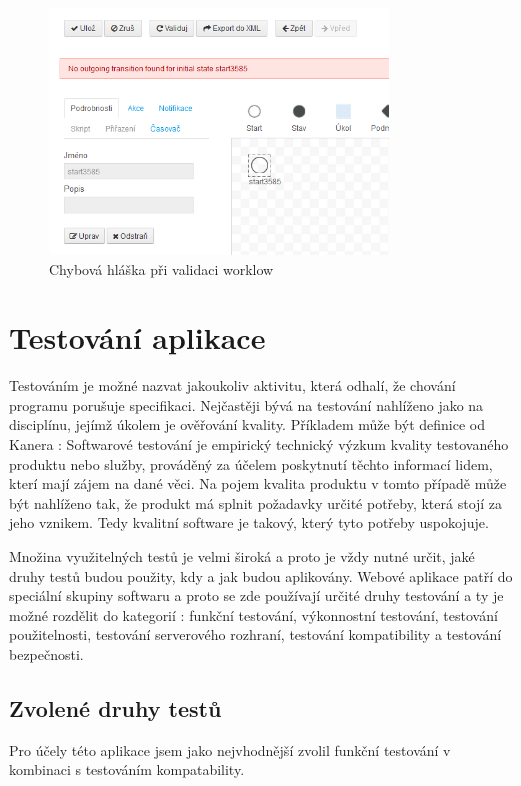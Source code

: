 \documentclass{fithesis}
\begin{document}
\begin{figure}[htp]
\centering
\includegraphics[width=340px]{images/error_message.png}
\caption{Chybová hláška při validaci worklow}
\label{fig:error}
\end{figure}





\chapter{Testování aplikace}
Testováním je možné nazvat jakoukoliv aktivitu, která odhalí, že chování programu porušuje specifikaci. Nejčastěji bývá na testování nahlíženo jako na disciplínu, jejímž úkolem je ověřování kvality. Příkladem může být definice od Kanera \cite{kaner}: Softwarové testování je empirický technický výzkum kvality testovaného produktu nebo služby, prováděný za účelem poskytnutí těchto informací lidem, kterí mají zájem na dané věci. Na pojem kvalita produktu v tomto případě může být nahlíženo tak, že produkt má splnit požadavky určité potřeby, která stojí za jeho vznikem. Tedy kvalitní software je takový, který tyto potřeby uspokojuje.

Množina využitelných testů je velmi široká a proto je vždy nutné určit, jaké druhy testů budou použity, kdy a jak budou aplikovány. Webové aplikace patří do speciální skupiny softwaru a proto se zde používají určité druhy testování a ty je možné rozdělit do kategorií \cite{web-test}:  funkční testování, výkonnostní testování, testování použitelnosti, testování serverového rozhraní, testování kompatibility a testování bezpečnosti.

\section{Zvolené druhy testů}
Pro účely této aplikace jsem jako nejvhodnější zvolil funkční testování v kombinaci s testováním kompatability.
\end{document}
